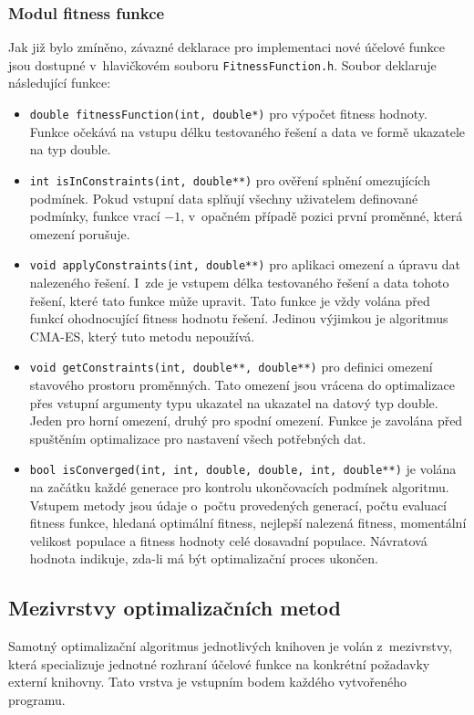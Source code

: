 \subsubsection{Modul fitness funkce}
Jak již bylo zmíněno, závazné deklarace pro implementaci nové účelové funkce jsou dostupné v~hlavičkovém souboru \texttt{FitnessFunction.h}. Soubor deklaruje následující funkce:
\begin{itemize}
    \item \verb|double fitnessFunction(int, double*)| pro výpočet fitness hodnoty. Funkce očekává na vstupu délku testovaného řešení a data ve formě ukazatele na typ double.
    \item \verb|int isInConstraints(int, double**)| pro ověření splnění omezujících podmínek. Pokud vstupní data splňují všechny uživatelem definované podmínky, funkce vrací $-1$, v~opačném případě pozici první proměnné, která omezení porušuje.
    \item \verb|void applyConstraints(int, double**)| pro aplikaci omezení a úpravu dat nalezeného řešení. I~zde je vstupem délka testovaného řešení a data tohoto řešení, které tato funkce může upravit. Tato funkce je vždy volána před funkcí ohodnocující fitness hodnotu řešení. Jedinou výjimkou je algoritmus CMA-ES, který tuto metodu nepoužívá.
    \item \verb|void getConstraints(int, double**, double**)| pro definici omezení stavového prostoru proměnných. Tato omezení jsou vrácena do optimalizace přes vstupní argumenty typu ukazatel na ukazatel na datový typ double. Jeden pro horní omezení, druhý pro spodní omezení. Funkce je zavolána před spuštěním optimalizace pro nastavení všech potřebných dat.
    \item \verb|bool isConverged(int, int, double, double, int, double**)| je volána na začátku každé generace pro kontrolu ukončovacích podmínek algoritmu. Vstupem metody jsou údaje o~počtu provedených generací, počtu evaluací fitness funkce, hledaná optimální fitness, nejlepší nalezená fitness, momentální velikost populace a fitness hodnoty celé dosavadní populace. Návratová hodnota indikuje, zda-li má být optimalizační proces ukončen.
\end{itemize}

\subsection{Mezivrstvy optimalizačních metod}
Samotný optimalizační algoritmus jednotlivých knihoven je volán z~mezivrstvy, která specializuje jednotné rozhraní účelové funkce na konkrétní požadavky externí knihovny. Tato vrstva je vstupním bodem každého vytvořeného programu.

